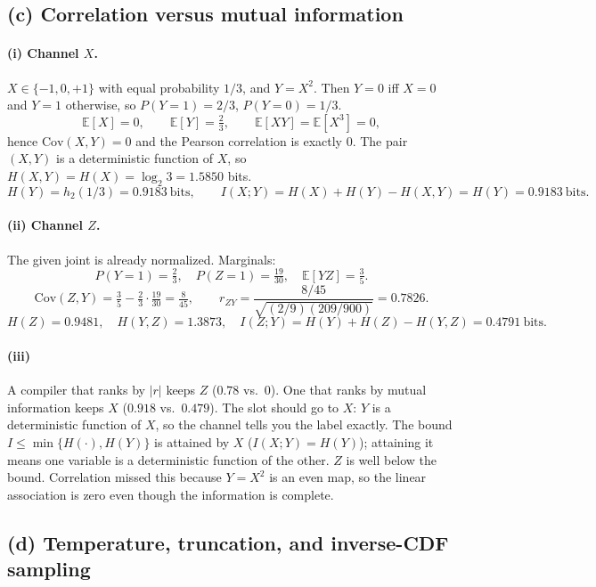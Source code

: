 \documentclass[11pt]{article}
\begin{document}
\subsection*{(c) Correlation versus mutual information}

\paragraph{(i) Channel \(X\).}
\(X\in\{-1,0,+1\}\) with equal probability \(1/3\), and \(Y=X^2\).
Then \(Y=0\) iff \(X=0\) and \(Y=1\) otherwise, so
\(P(Y=1)=2/3\), \(P(Y=0)=1/3\).
\[
\mathbb{E}[X]=0,\qquad
\mathbb{E}[Y]=\tfrac23,\qquad
\mathbb{E}[XY]=\mathbb{E}[X^3]=0,
\]
hence \(\mathrm{Cov}(X,Y)=0\) and the Pearson correlation is exactly 0.
The pair \((X,Y)\) is a deterministic function of \(X\), so
\(H(X,Y)=H(X)=\log_2 3=1.5850\) bits.
\[
H(Y)=h_2(1/3)=0.9183\ \text{bits},
\qquad
I(X;Y)=H(X)+H(Y)-H(X,Y)=H(Y)=0.9183\ \text{bits}.
\]

\paragraph{(ii) Channel \(Z\).}
The given joint is already normalized. Marginals:
\[
P(Y=1)=\tfrac23,\quad
P(Z=1)=\tfrac{19}{30},\quad
\mathbb{E}[YZ]=\tfrac35.
\]
\[
\mathrm{Cov}(Z,Y)=\tfrac35-\tfrac23\cdot\tfrac{19}{30}=\tfrac{8}{45},
\qquad
r_{ZY}=\frac{8/45}{\sqrt{(2/9)(209/900)}}=0.7826.
\]
\[
H(Z)=0.9481,\quad
H(Y,Z)=1.3873,\quad
I(Z;Y)=H(Y)+H(Z)-H(Y,Z)=0.4791\ \text{bits}.
\]

\paragraph{(iii)}
A compiler that ranks by \(|r|\) keeps \(Z\) (\(0.78\) vs.\ \(0\)).
One that ranks by mutual information keeps \(X\) (\(0.918\) vs.\ \(0.479\)).
The slot should go to \(X\): \(Y\) is a deterministic function of \(X\),
so the channel tells you the label exactly. The bound
\(I\le\min\{H(\cdot),H(Y)\}\) is attained by \(X\)
(\(I(X;Y)=H(Y)\)); attaining it means one variable is a deterministic
function of the other. \(Z\) is well below the bound. Correlation missed
this because \(Y=X^2\) is an even map, so the linear association is zero
even though the information is complete.

\subsection*{(d) Temperature, truncation, and inverse-CDF sampling}
\end{document}
